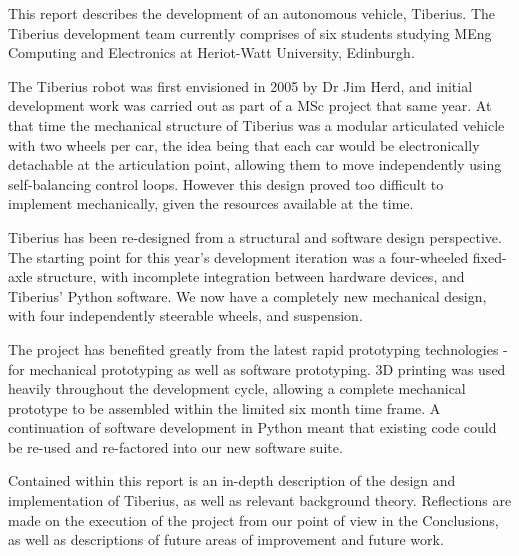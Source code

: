 This report describes the development of an autonomous vehicle, Tiberius. The Tiberius development team currently comprises of six students studying MEng Computing and Electronics at Heriot-Watt University, Edinburgh.
\newline

The Tiberius robot was first envisioned in 2005 by Dr Jim Herd, and initial development work was carried out as part of a MSc project that same year. At that time the mechanical structure of Tiberius was a modular articulated vehicle with two wheels per car, the idea being that each car would be electronically detachable at the articulation point, allowing them to move independently using self-balancing control loops. However this design proved too difficult to implement mechanically, given the resources available at the time.
\newline

Tiberius has been re-designed from a structural and software design perspective. The starting point for this year's development iteration was a four-wheeled fixed-axle structure, with incomplete integration between hardware devices, and Tiberius' Python software. We now have a completely new mechanical design, with four independently steerable wheels, and suspension.
\newline

The project has benefited greatly from the latest rapid prototyping technologies - for mechanical prototyping as well as software prototyping. 3D printing was used heavily throughout the development cycle, allowing a complete mechanical prototype to be assembled within the limited six month time frame. A continuation of software development in Python meant that existing code could be re-used and re-factored into our new software suite.
\newline

Contained within this report is an in-depth description of the design and implementation of Tiberius, as well as relevant background theory. Reflections are made on the execution of the project from our point of view in the Conclusions, as well as descriptions of future areas of improvement and future work.

\pagebreak